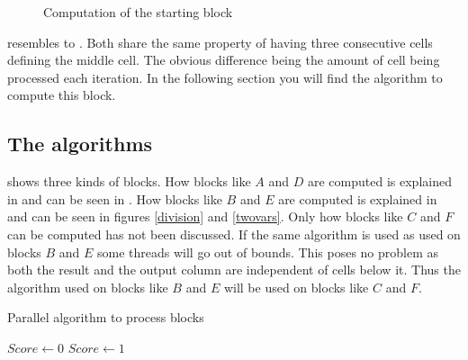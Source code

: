 \begin{figure}
    \centering
    
    \caption{Computation of the starting block} \label{start}
\end{figure}

 resembles to .
Both share the same property of having three consecutive cells defining the middle cell.
The obvious difference being the amount of cell being processed each iteration.
In the following section you will find the algorithm to compute this block.

\subsection{The algorithms}
 shows three kinds of blocks.
How blocks like $A$ and $D$ are computed is explained in  and can be seen in .
How blocks like $B$ and $E$ are computed is explained in  and can be seen in figures \ref{division} and \ref{twovars}.
Only how blocks like $C$ and $F$ can be computed has not been discussed.
If the same algorithm is used as used on blocks $B$ and $E$ some threads will go out of bounds.
This poses no problem as both the result and the output column are independent of cells below it.
Thus the algorithm used on blocks like $B$ and $E$ will be used on blocks like $C$ and $F$.

\begin{algorithm}
\caption{Parallel algorithm to process blocks} \label{block}
\begin{algorithmic}[1]
    \Statex
        \Statex
            \State $Score \gets 0$
        \Else
            \State $Score \gets 1$
        \EndIf
        \Statex
        \Statex
        \Statex
    \EndFor
\EndProcedure
\end{algorithmic}
\end{algorithm}

